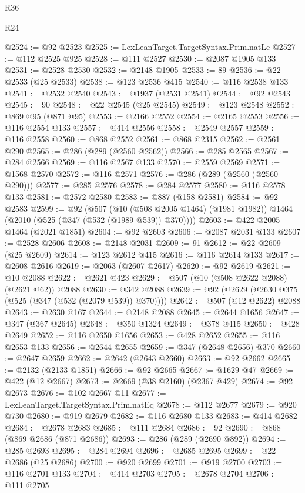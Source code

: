 \begin{lexlean}{R36}
\begin{lexlean}{R24}
\begin{coremodule}
{{{{{{{{{{{{{{{{{{{{{{{{{{{{{{{{{{{{{{{{{{{{{{{{{{{{{{{{{{{{{{{{{{{{{{{{{{{{{{{{{{{{{{{{{{{{{{{{{{{{{{{{{{{{{{{{{{{{{{{{{{{{{{{{{{{{{{{{{{{{{{{{{{{{{{{{{{{{{{{{{{{{{{{{{{{{{{{{{{{{{{{{{{{{{{{{{{{@2524 := @92 @2523
@2525 := LexLeanTarget.TargetSyntax.Prim.natLe
@2527 := @112 @2525 @925
@2528 := @111 @2527
@2530 := @2087 @1905 @133
@2531 := @2528 @2530
@2532 := @2148 @1905
@2533 := 89
@2536 := @22 @2533 (@25 @2533)
@2538 := @123 @2536 @415
@2540 := @116 @2538 @133
@2541 := @2532 @2540
@2543 := @1937 (@2531 @2541)
@2544 := @92 @2543
@2545 := 90
@2548 := @22 @2545 (@25 @2545)
@2549 := @123 @2548
@2552 := @869 @95 (@871 @95)
@2553 := @2166 @2552
@2554 := @2165 @2553
@2556 := @116 @2554 @133
@2557 := @414 @2556
@2558 := @2549 @2557
@2559 := @116 @2558
@2560 := @868 @2552
@2561 := @868 @2315
@2562 := @2561 @290
@2565 := @286 (@289 (@2560 @2562))
@2566 := @285 @2565
@2567 := @284 @2566
@2569 := @116 @2567 @133
@2570 := @2559 @2569
@2571 := @1568 @2570
@2572 := @116 @2571
@2576 := @286 (@289 (@2560 (@2560 @290)))
@2577 := @285 @2576
@2578 := @284 @2577
@2580 := @116 @2578 @133
@2581 := @2572 @2580
@2583 := @887 (@158 @2581)
@2584 := @92 @2583
@2599 := @92
    (@507
      (@10 (@508 @2005 @1464) (@1981 @1982))
      @1464
      (@2010 (@525 (@347 (@532 (@1989 @539)) @370))))
@2603 := @422 @2005 @1464 (@2021 @1851)
@2604 := @92 @2603
@2606 := @2087 @2031 @133
@2607 := @2528 @2606
@2608 := @2148 @2031
@2609 := 91
@2612 := @22 @2609 (@25 @2609)
@2614 := @123 @2612 @415
@2616 := @116 @2614 @133
@2617 := @2608 @2616
@2619 := @2063 (@2607 @2617)
@2620 := @92 @2619
@2621 := @10 @2088
@2622 := @2621 @423
@2629 := @507 (@10 (@508 @2622 @2088) (@2621 @62)) @2088
@2630 := @342 @2088
@2639 := @92 (@2629 (@2630 @375 (@525 (@347 (@532 (@2079 @539)) @370))))
@2642 := @507 (@12 @2622) @2088
@2643 := @2630 @167
@2644 := @2148 @2088
@2645 := @2644 @1656
@2647 := @347 (@367 @2645)
@2648 := @350 @1324
@2649 := @378 @415
@2650 := @428 @2649
@2652 := @116 @2650 @1656
@2653 := @428 @2652
@2655 := @116 @2653 @133
@2656 := @2644 @2655
@2659 := @347 (@2648 @2656) @370
@2660 := @2647 @2659
@2662 := @2642 (@2643 @2660)
@2663 := @92 @2662
@2665 := @2132 (@2133 @1851)
@2666 := @92 @2665
@2667 := @1629 @47
@2669 := @422 (@12 @2667)
@2673 := @2669 (@38 @2160) (@2367 @429)
@2674 := @92 @2673
@2676 := @102 @2667 @11
@2677 := LexLeanTarget.TargetSyntax.Prim.natEq
@2678 := @112 @2677
@2679 := @920 @730
@2680 := @919 @2679
@2682 := @116 @2680 @133
@2683 := @414 @2682
@2684 := @2678 @2683
@2685 := @111 @2684
@2686 := 92
@2690 := @868 (@869 @2686 (@871 @2686))
@2693 := @286 (@289 (@2690 @892))
@2694 := @285 @2693
@2695 := @284 @2694
@2696 := @2685 @2695
@2699 := @22 @2686 (@25 @2686)
@2700 := @920 @2699
@2701 := @919 @2700
@2703 := @116 @2701 @133
@2704 := @414 @2703
@2705 := @2678 @2704
@2706 := @111 @2705
}}}}}}}}}}}}}}}}}}}}}}}}}}}}}}}}}}}}}}}}}}}}}}}}}}}}}}}}}}}}}}}}}}}}}}}}}}}}}}}}}}}}}}}}}}}}}}}}}}}}}}}}}}}}}}}}}}}}}}}}}}}}}}}}}}}}}}}}}}}}}}}}}}}}}}}}}}}}}}}}}}}}}}}}}}}}}}}}}}}}}}}}}}}}}}}}}}}
\end{coremodule}
\end{lexlean}
\end{lexlean}
